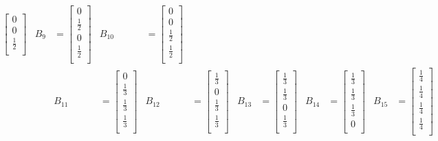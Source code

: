 \documentclass{mitschrift}
\begin{document}
\begin{align}
\begin{bmatrix}
        0 \\
        0 \\
        \frac{1}{2} \\
    \end{bmatrix} & B_9 &= \begin{bmatrix}
        0 \\
        \frac{1}{2} \\
        0 \\
        \frac{1}{2} \\
    \end{bmatrix} &B_{10} &= \begin{bmatrix}
        0 \\
        0 \\
        \frac{1}{2} \\
        \frac{1}{2} \\
    \end{bmatrix} \\
    && B_{11} &= \begin{bmatrix}
        0 \\
        \frac{1}{3} \\
        \frac{1}{3} \\
        \frac{1}{3} \\
    \end{bmatrix} & B_{12} &= \begin{bmatrix}
        \frac{1}{3} \\
        0 \\
        \frac{1}{3} \\
        \frac{1}{3} \\
    \end{bmatrix} & B_{13} &= \begin{bmatrix}
        \frac{1}{3} \\
        \frac{1}{3} \\
        0 \\
        \frac{1}{3} \\
    \end{bmatrix} & B_{14} &= \begin{bmatrix}
        \frac{1}{3} \\
        \frac{1}{3} \\
        \frac{1}{3} \\
        0 \\
    \end{bmatrix} & B_{15} &= \begin{bmatrix}
        \frac{1}{4} \\
        \frac{1}{4} \\
        \frac{1}{4} \\
        \frac{1}{4} \\
    \end{bmatrix}
\end{align}
\end{document}
